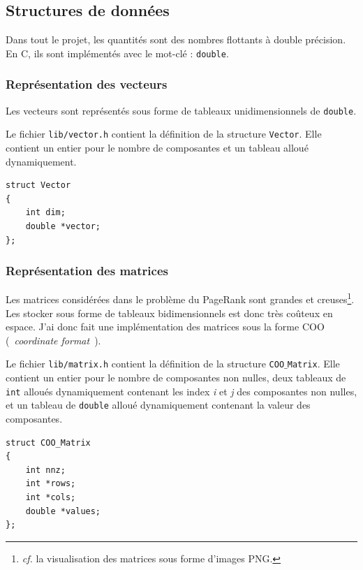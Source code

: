 \documentclass[a4paper,12pt]{article}
\begin{document}
\subsection{Structures de données}

Dans tout le projet, les quantités sont des nombres flottants à double précision. En C, ils sont implémentés avec le mot-clé : \texttt{double}.

\subsubsection{Représentation des vecteurs}

Les vecteurs sont représentés sous forme de tableaux unidimensionnels de \texttt{double}.

\bigskip

Le fichier \texttt{lib/vector.h} contient la définition de la structure \texttt{Vector}. Elle contient un entier pour le nombre de composantes et un tableau alloué dynamiquement.

\bigskip

\begin{lstlisting}
struct Vector
{
	int dim;
	double *vector;
};
\end{lstlisting}

\vspace{2cm}

\subsubsection{Représentation des matrices}

Les matrices considérées dans le problème du PageRank sont grandes et creuses\footnote{\textit{cf.} la visualisation des matrices sous forme d'images PNG.}. Les stocker sous forme de tableaux bidimensionnels est donc très coûteux en espace. J'ai donc fait une implémentation des matrices sous la forme COO (~\textit{coordinate format}~).

\bigskip

Le fichier \texttt{lib/matrix.h} contient la définition de la structure \texttt{COO$\_$Matrix}. Elle con\-tient un entier pour le nombre de composantes non nulles, deux tableaux de \texttt{int} alloués dynamiquement contenant les index \textit{i} et \textit{j} des composantes non nulles, et un tableau de \texttt{double} alloué dynamiquement contenant la valeur des composantes.

\bigskip

\begin{lstlisting}
struct COO_Matrix
{
	int nnz;
	int *rows;
	int *cols;
	double *values;
};
\end{lstlisting}
\end{document}
